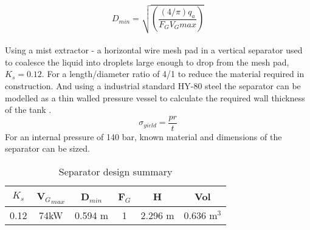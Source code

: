 \begin{equation}D_{min} = \sqrt{\left ( \frac{(4/\pi)q_a}{F_GV_Gmax} \right ) } \end{equation}
\\ 
Using a mist extractor - a horizontal wire mesh pad in a vertical separator used to coalesce the liquid into droplets large enough to drop from the mesh pad, $K_s = 0.12$. For a length/diameter ratio of 4/1 to reduce the material required in construction. And using a industrial standard HY-80 steel the separator can be modelled as a thin walled pressure vessel to calculate the required wall thickness of the tank \cite{Howatson1972}.
\begin{equation}
	\sigma_{yield}=\frac{pr}{t}
\end{equation}
For an internal pressure of 140 bar, known material and dimensions of the separator can be sized.

\begin{table}[!htbp]
	\begin{center}
		\caption{Separator design summary}
		\begin{tabular}{ |c|c|c|c|c|c| }
			\hline
			
			$K_s$ & V${_G}_{max}$&D$_{min}$ &F$_G$& H & Vol \\
			\hline
			0.12& 74kW & 0.594 m &1 & 2.296 m & 0.636 m$^3$\\
			
			
			\hline
		\end{tabular}
	\end{center}
\end{table}
